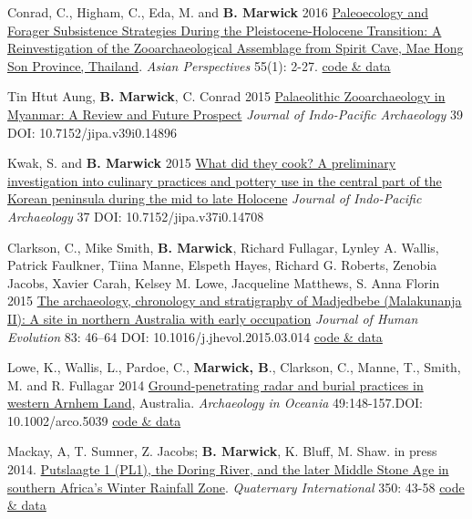 \documentclass[11pt,article,oneside]{memoir}
\begin{document}
{{{{\ind Conrad, C., Higham, C., Eda, M. and \textbf{B. Marwick} 2016 \href{https://doi.org/10.1353/asi.2016.0013}{Paleoecology and Forager Subsistence Strategies During the Pleistocene-Holocene Transition: A Reinvestigation of the Zooarchaeological Assemblage from Spirit Cave, Mae Hong Son Province, Thailand}. \textit{Asian Perspectives} 55(1): 2-27. \href{http://hdl.handle.net/1928/26730}{code \& data}

\ind Tin Htut Aung, \textbf{B. Marwick}, C. Conrad 2015 \href{https://journals.lib.washington.edu/index.php/JIPA/article/view/14896}{Palaeolithic Zooarchaeology in Myanmar: A Review and Future Prospect} \textit{Journal of Indo-Pacific Archaeology} 39 DOI: 10.7152/jipa.v39i0.14896

\ind Kwak, S. and \textbf{B. Marwick} 2015 \href{http://journals.lib.washington.edu/index.php/JIPA/article/view/14708}{What did they cook? A preliminary investigation into culinary practices and pottery use in the central part of the Korean peninsula during the mid to late Holocene} \textit{Journal of Indo-Pacific Archaeology} 37  DOI: 10.7152/jipa.v37i0.14708

\ind Clarkson, C., Mike Smith, \textbf{B. Marwick}, Richard Fullagar, Lynley A. Wallis, Patrick Faulkner, Tiina Manne, Elspeth Hayes, Richard G. Roberts, Zenobia Jacobs, Xavier Carah, Kelsey M. Lowe, Jacqueline Matthews, S. Anna Florin 2015 \href{http://www.sciencedirect.com/science/article/pii/S0047248415000846}{The archaeology, chronology and stratigraphy of Madjedbebe (Malakunanja II): A site in northern Australia with early occupation} \textit{Journal of Human Evolution} 83: 46–64 DOI: 10.1016/j.jhevol.2015.03.014 \href{https://github.com/benmarwick/1989-excavation-report-Madjebebe}{code \& data}

\ind Lowe, K., Wallis, L., Pardoe, C., \textbf{Marwick, B}., Clarkson, C., Manne, T., Smith, M. and R. Fullagar 2014 \href{http://faculty.washington.edu/bmarwick/PDFs/Lowe_et_al_2014_MJB_GPR.pdf}{Ground-penetrating radar and burial practices in western Arnhem Land}, Australia. \textit{Archaeology in Oceania} 49:148-157.\newline  DOI: 10.1002/arco.5039 \href{https://github.com/benmarwick/Rocks-and-burials-at-Madjebebe}{code \& data}

\ind Mackay, A, T. Sumner, Z. Jacobs; \textbf{B. Marwick}, K. Bluff, M. Shaw. in press 2014.  \href{http://faculty.washington.edu/bmarwick/PDFs/Mackay_et_al_2014.pdf}{Putslaagte 1 (PL1), the Doring River, and the later Middle Stone Age in southern Africa's Winter Rainfall Zone}. \textit{Quaternary International} 350: 43-58 \href{https://github.com/benmarwick/Particle-size-analysis-Putslaagte-1}{code \& data}

}}}}
\end{document}

